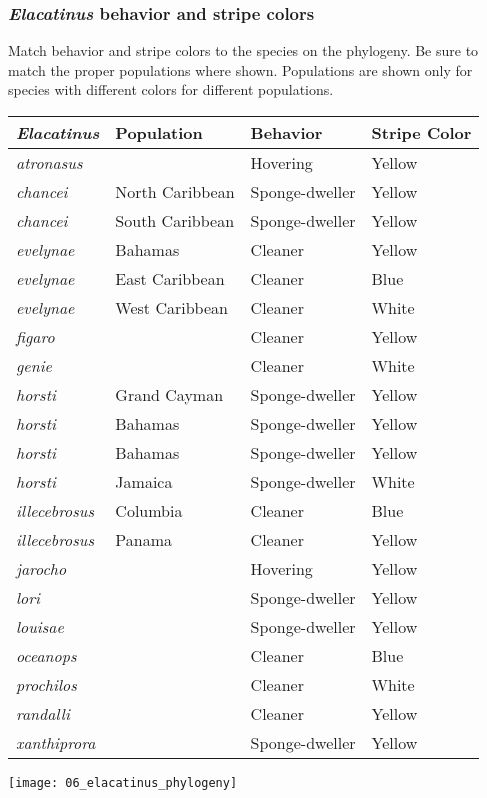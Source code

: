 \documentclass[12pt, hidelinks]{exam}
\begin{document}
\newpage

\subsubsection*{\textit{Elacatinus} behavior and stripe colors}


Match behavior and stripe colors to the species on the phylogeny. Be sure to
match the proper populations where shown. Populations are shown only for
species with different colors for different populations.

\begin{tabular}[c]{@{}llll@{}}
\toprule
\textit{Elacatinus}		&	Population			&	Behavior				&	Stripe Color \tabularnewline
\midrule
\textit{atronasus}		&								&	Hovering				&	Yellow	\tabularnewline
\textit{chancei} 			&	North Caribbean	&	Sponge-dweller		&	Yellow	\tabularnewline
\textit{chancei} 			&	South Caribbean	&	Sponge-dweller		&	Yellow	\tabularnewline
\textit{evelynae} 		&	Bahamas				&	Cleaner					&	Yellow	\tabularnewline
\textit{evelynae} 		&	East Caribbean		&	Cleaner					&	Blue 		\tabularnewline
\textit{evelynae} 		&	West Caribbean	&	Cleaner					&	White	\tabularnewline
\textit{figaro}				&								&	Cleaner					&	Yellow	\tabularnewline
\textit{genie}				&								&	Cleaner					&	White	\tabularnewline
\textit{horsti} 				&	Grand Cayman		&	Sponge-dweller		&	Yellow	\tabularnewline
\textit{horsti} 				&	Bahamas				&	Sponge-dweller		&	Yellow	\tabularnewline
\textit{horsti} 				&	Bahamas				&	Sponge-dweller		&	Yellow	\tabularnewline
\textit{horsti} 				&	Jamaica				&	Sponge-dweller		&	White	\tabularnewline
\textit{illecebrosus}	&	Columbia				&	Cleaner					&	Blue		\tabularnewline
\textit{illecebrosus} 	&	Panama				&	Cleaner					&	Yellow	\tabularnewline
\textit{jarocho}			&								&	Hovering				&	Yellow	\tabularnewline
\textit{lori}					&								&	Sponge-dweller		&	Yellow	\tabularnewline
\textit{louisae}			&								&	Sponge-dweller		&	Yellow	\tabularnewline
\textit{oceanops}		&								&	Cleaner					&	Blue		\tabularnewline
\textit{prochilos}		&								&	Cleaner					&	White	\tabularnewline
\textit{randalli}			&								&	Cleaner					&	Yellow	\tabularnewline
\textit{xanthiprora}		&								&	Sponge-dweller		&	Yellow	\tabularnewline
\bottomrule
\end{tabular}

\newpage

	\texttt{[image: 06\_elacatinus\_phylogeny]}
\end{document}
